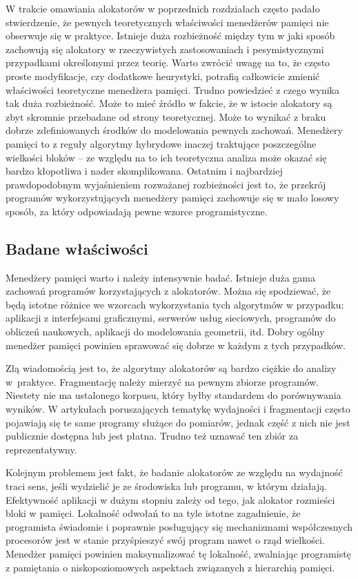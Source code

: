 \documentclass[12pt,a4paper,titlepage,twoside]{mwart}
\begin{document}
W trakcie omawiania alokatorów w poprzednich rozdziałach często padało
stwierdzenie, że pewnych teoretycznych właściwości menedżerów pamięci nie
obserwuje się w praktyce. Istnieje duża rozbieżność między tym w jaki sposób
zachowują się alokatory w rzeczywistych zastosowaniach i pesymistycznymi
przypadkami określonymi przez teorię. Warto zwrócić uwagę na to, że często
proste modyfikacje, czy dodatkowe heurystyki, potrafią całkowicie zmienić
właściwości teoretyczne menedżera pamięci. Trudno powiedzieć z czego wynika tak
duża rozbieżność. Może to mieć źródło w fakcie, że w istocie alokatory są zbyt
skromnie przebadane od strony teoretycznej. Może to wynikać z braku dobrze
zdefiniowanych środków do modelowania pewnych zachowań.  Menedżery pamięci to z
reguły algorytmy hybrydowe inaczej traktujące poszczególne wielkości bloków --
ze względu na to ich teoretyczna analiza może okazać się bardzo kłopotliwa i
nader skomplikowana. Ostatnim i najbardziej prawdopodobnym wyjaśnieniem rozważanej
rozbieżności jest to, że przekrój programów wykorzystujących menedżery pamięci
zachowuje się w mało losowy sposób, za który odpowiadają pewne wzorce
programistyczne.

\subsection{Badane właściwości}

Menedżery pamięci warto i należy intensywnie badać. Istnieje duża gama zachowań
programów korzystających z alokatorów. Można się spodziewać, że będą istotne
różnice we wzorcach wykorzystania tych algorytmów w przypadku: aplikacji z
interfejsami graficznymi, serwerów usług sieciowych, programów do obliczeń
naukowych, aplikacji do modelowania geometrii, itd. Dobry ogólny menedżer
pamięci powinien sprawować się dobrze w każdym z tych przypadków.

Złą wiadomością jest to, że algorytmy alokatorów są bardzo ciężkie do analizy
w~praktyce. Fragmentację należy mierzyć na pewnym zbiorze programów. Niestety
nie ma ustalonego korpusu, który byłby standardem do porównywania wyników.  W
artykułach poruszających tematykę wydajności i fragmentacji często pojawiają
się te same programy służące do pomiarów, jednak część z nich nie jest
publicznie dostępna lub jest płatna. Trudno też uznawać ten zbiór za
reprezentatywny.

Kolejnym problemem jest fakt, że badanie alokatorów ze względu na wydajność
traci sens, jeśli wydzielić je ze środowiska lub programu, w którym działają.
Efektywność aplikacji w dużym stopniu zależy od tego, jak alokator rozmieści
bloki w pamięci. Lokalność odwołań to na tyle istotne zagadnienie, że
programista świadomie i poprawnie posługujący się mechanizmami współczesnych
procesorów jest w stanie przyśpieszyć swój program nawet o rząd wielkości.
Menedżer pamięci powinien maksymalizować tę lokalność, zwalniając programistę z
pamiętania o niskopoziomowych aspektach związanych z hierarchią pamięci.
\end{document}
